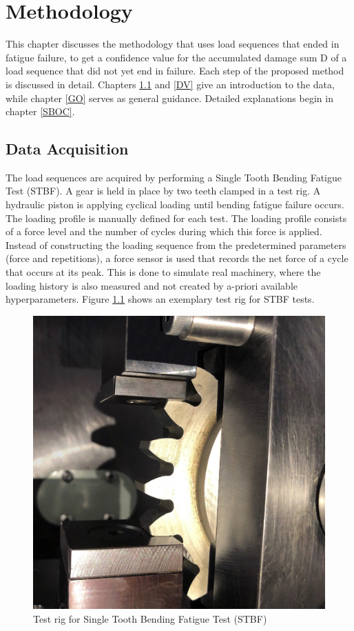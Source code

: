 \chapter{Methodology}\label{MET}
This chapter discusses the methodology that uses load sequences that ended in fatigue failure, to get a confidence value for the accumulated damage sum D of a load sequence that did not yet end in failure. Each step of the proposed method is discussed in detail. Chapters \ref{DA} and \ref{DV} give an introduction to the data, while chapter \ref{GO} serves as general guidance. Detailed explanations begin in chapter \ref{SBOC}.

\section{Data Acquisition}\label{DA}
The load sequences are acquired by performing a Single Tooth Bending Fatigue Test (STBF). A gear is held in place by two teeth clamped in a test rig. A hydraulic piston is applying cyclical loading until bending fatigue failure occurs. The loading profile is manually defined for each test. The loading profile consists of a force level and the number of cycles during which this force is applied. Instead of constructing the loading sequence from the predetermined parameters (force and repetitions), a force sensor is used that records the net force of a cycle that occurs at its peak. This is done to simulate real machinery, where the loading history is also measured and not created by a-priori available hyperparameters. 
Figure \ref{fig:STBFT} shows an exemplary test rig for STBF tests.
\begin{figure}[H]
	\centering
	\includegraphics[width=0.5\linewidth]{IMGs/tooth.jpg}
	\caption{Test rig for Single Tooth Bending Fatigue Test (STBF) \cite{STBT}}
	\label{fig:STBFT}
\end{figure}
\newpage
